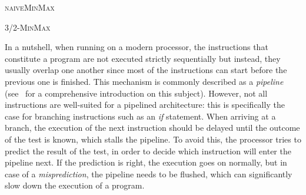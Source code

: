 \documentclass[proceedings]{aofa}
\begin{document}
\noindent
\begin{minipage}{.41\textwidth}
\begin{small}
\begin{algorithm}[H]
\DontPrintSemicolon
  \;
  \;
  \smallskip
                                     

  \Return 
\caption{ \textsc{naiveMinMax} \label{algo:naiveMinMax}}
\end{algorithm}
\end{small}

\medskip
\end{minipage}  
\hfill
\begin{minipage}{.54\textwidth}
\vspace{0pt}  
\begin{algorithm}[H]
\begin{small}
\DontPrintSemicolon
  \;
  \Return 
\caption{ \textsc{3/2-MinMax} \label{algo:32MinMax}}
\end{small}
\end{algorithm}
\medskip
\end{minipage}

In a nutshell, when running on a modern processor, the instructions that constitute a program are not executed strictly sequentially but instead, they usually overlap one another since most of the instructions can start before the previous one is finished. This mechanism is commonly described as a {\em pipeline} (see~\cite{HePa11} for a comprehensive introduction on this subject). However, not all instructions are well-suited for a pipelined architecture: this is specifically the case for branching instructions such as an \emph{if} statement. When arriving at a branch, the execution of the next instruction should be delayed until the outcome of the test is known, which stalls the pipeline. To avoid this, the processor tries to predict the result of the test, in order to decide which instruction will enter the pipeline next.
If the prediction is right, the execution goes on normally, but in case of a {\em misprediction}, the pipeline needs to be flushed, which can significantly slow down the execution of a program.
\end{document}
